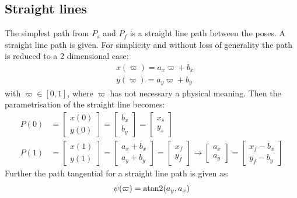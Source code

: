 \subsection{Straight lines}
The simplest path from $P_s$ and $P_f$ is a straight line path between the poses. A straight line path is given. For simplicity and without loss of generality the path is reduced to a 2 dimensional case: 
\begin{subequations}
\begin{align}
& x(\varpi) = a_x\varpi + b_x \\
& y(\varpi) = a_y\varpi + b_y 
\end{align}
\end{subequations}
with $ \varpi \in [0,1] $, where $\varpi$ has not necessary a physical meaning. Then the parametrisation of the straight line becomes:
\begin{subequations}
\begin{align}
P(0) &= \begin{bmatrix}
x(0) \\
y(0)
\end{bmatrix} = \begin{bmatrix}
b_x \\
b_y
\end{bmatrix} = \begin{bmatrix}
x_s \\
y_s
\end{bmatrix} \\
P(1) &= \begin{bmatrix}
x(1) \\
y(1)
\end{bmatrix} = \begin{bmatrix}
a_x + b_x \\
a_y + b_y
\end{bmatrix} = \begin{bmatrix}
x_f \\
y_f
\end{bmatrix} \rightarrow \begin{bmatrix}
a_x \\
a_y
\end{bmatrix} = \begin{bmatrix}
x_f - b_x \\
y_f - b_y
\end{bmatrix}
\end{align}
\end{subequations}
Further the path tangential for a straight line path is given as:
\begin{equation}
\psi(\varpi) = \atan2(a_y,a_x)
\end{equation}
